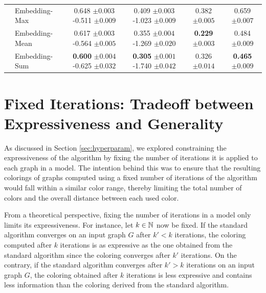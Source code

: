 \begin{table}[!t]
{\begin{tabular}{@{}c <{\enspace}@{}lcccc@{}}
			& \textsf{Embedding-Max} & 0.648 {\scriptsize $\pm 0.003$} -0.511 {\scriptsize $\pm 0.009$} &	0.409 {\scriptsize $\pm 0.003$} -1.023 {\scriptsize $\pm 0.009$} &	0.382 {\scriptsize $\pm 0.005$} &	0.659 {\scriptsize $\pm 0.007$}
			\\
			& \textsf{Embedding-Mean} & 0.617 {\scriptsize $\pm 0.003$} -0.564 {\scriptsize $\pm 0.005$} &	0.355 {\scriptsize $\pm 0.004$} -1.269 {\scriptsize $\pm 0.020$} &	\textbf{0.229} {\scriptsize $\pm 0.003$} &	0.484 {\scriptsize $\pm 0.009$}
			\\
			& \textsf{Embedding-Sum} & \textbf{0.600} {\scriptsize $\pm 0.004$} -0.625 {\scriptsize $\pm 0.032$} & \textbf{0.305} {\scriptsize $\pm 0.001$} -1.740 {\scriptsize $\pm 0.042$} &	0.326 {\scriptsize $\pm 0.014$} &	\textbf{0.465} {\scriptsize $\pm 0.009$}
			\\
			\bottomrule
	\end{tabular}}
\end{table}

\FloatBarrier
\section{Fixed \wl Iterations: Tradeoff between Expressiveness and Generality}\label{sec:tradeoff_expressiveness}
As discussed in Section \ref{sec:hyperparam}, we explored constraining the expressiveness of the \wl algorithm by fixing the number of iterations it is applied to each graph in a \wlnn model. The intention behind this was to ensure that the resulting colorings of graphs computed using a fixed number of iterations of the \wl algorithm would fall within a similar color range, thereby limiting the total number of colors and the overall distance between each used color. 

From a theoretical perspective, fixing the number of \wl iterations in a \wlnn model only limits its expressiveness. For instance, let $k \in \mathbb{N}$ now be fixed. If the standard \wl algorithm converges on an input graph $G$ after $k' < k$ iterations, the coloring computed after $k$ iterations is as expressive as the one obtained from the standard \wl algorithm since the coloring converges after $k'$ iterations. On the contrary, if the standard \wl algorithm converges after $k' > k$ iterations on an input graph $G$, the coloring obtained after $k$ iterations is less expressive and contains less information than the coloring derived from the standard \wl algorithm.

